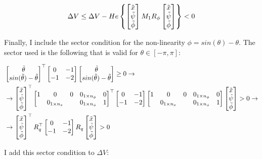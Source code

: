 \documentclass{article}
\begin{document}
$$
  \Delta V \leq \Delta V - He \left\{\left[\begin{matrix}
    \tilde{x} \\
    \tilde{\psi} \\
    \tilde{\phi}
  \end{matrix}\right] M_{1} R_{\phi} \left[\begin{matrix}
    \tilde{x} \\
    \tilde{\psi} \\
    \tilde{\phi}
  \end{matrix}\right]\right\} < 0
$$

Finally, I include the sector condition for the non-linearity $\phi = sin(\theta) - \theta$. The sector used is the following that is valid for $\theta \in \left[ -\pi, \pi \right]$:

\begin{align*}
  & \left[\begin{matrix}
    \tilde{\theta} \\
    sin(\tilde{\theta}) - \tilde{\theta}
  \end{matrix}\right]^\top \left[\begin{matrix}
    0 & -1 \\
    -1 & -2
  \end{matrix}\right] \left[\begin{matrix}
    \tilde{\theta} \\
    sin(\tilde{\theta}) - \tilde{\theta}
  \end{matrix}\right] \geq 0 \to \\
  & \to \left[\begin{matrix}
    \tilde{x} \\
    \tilde{\psi} \\
    \tilde{\phi}
  \end{matrix}\right]^\top \left[\begin{matrix}
    1 & 0 & 0 & 0_{1 \times n_{\phi}} & 0 \\
    & 0_{1 \times n_{x}} & & 0_{1 \times n_{\phi}} & 1
  \end{matrix}\right]^\top \left[\begin{matrix}
    0 & -1 \\
    -1 & -2
  \end{matrix}\right] \left[\begin{matrix}
    1 & 0 & 0 & 0_{1 \times n_{\phi}} & 0 \\
    & 0_{1 \times n_{x}} & & 0_{1 \times n_{\phi}} & 1
  \end{matrix}\right] \left[\begin{matrix}
    \tilde{x} \\
    \tilde{\psi} \\
    \tilde{\phi}
  \end{matrix}\right] > 0 \to \\
  & \to \left[\begin{matrix}
    \tilde{x} \\
    \tilde{\psi} \\
    \tilde{\phi}
  \end{matrix}\right]^\top R_{q}^\top \left[\begin{matrix}
    0 & -1 \\
    -1 & -2
  \end{matrix}\right] R_{q} \left[\begin{matrix}
    \tilde{x} \\
    \tilde{\psi} \\
    \tilde{\phi}
  \end{matrix}\right] > 0
\end{align*}

I add this sector condition to $\Delta V$:
\end{document}
